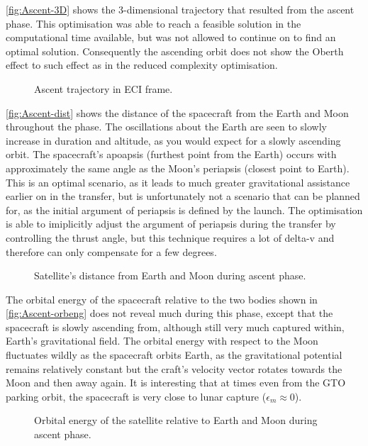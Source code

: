 \autoref{fig:Ascent-3D} shows the 3-dimensional trajectory that resulted from the ascent phase. This optimisation was able to reach a feasible solution in the computational time available, but was not allowed to continue on to find an optimal solution. Consequently the ascending orbit does not show the Oberth effect to such effect as in the reduced complexity optimisation.

\begin{figure}
\centering
\def\svgwidth{\figurewidth}

\caption{Ascent trajectory in ECI frame.}
\label{fig:Ascent-3D}
\end{figure}

\autoref{fig:Ascent-dist} shows the distance of the spacecraft from the Earth and Moon throughout the phase. The oscillations about the Earth are seen to slowly increase in duration and altitude, as you would expect for a slowly ascending orbit. The spacecraft's apoapsis (furthest point from the Earth) occurs with approximately the same angle as the Moon's periapsis (closest point to Earth). This is an optimal scenario, as it leads to much greater gravitational assistance earlier on in the transfer, but is unfortunately not a scenario that can be planned for, as the initial argument of periapsis is defined by the launch. The optimisation is able to imiplicitly adjust the argument of periapsis during the transfer by controlling the thrust angle, but this technique requires a lot of delta-v and therefore can only compensate for a few degrees.

\begin{figure}
\centering
\def\svgwidth{\figurewidth}

\caption{Satellite's distance from Earth and Moon during ascent phase.}
\label{fig:Ascent-dist}
\end{figure}

The orbital energy of the spacecraft relative to the two bodies shown in \autoref{fig:Ascent-orbeng} does not reveal much during this phase, except that the spacecraft is slowly ascending from, although still very much captured within, Earth's gravitational field. The orbital energy with respect to the Moon fluctuates wildly as the spacecraft orbits Earth, as the gravitational potential remains relatively constant but the craft's velocity vector rotates towards the Moon and then away again. It is interesting that at times even from the GTO parking orbit, the spacecraft is very close to lunar capture ($\epsilon_m\approx0$).

\begin{figure}
\centering
\def\svgwidth{\figurewidth}

\caption{Orbital energy of the satellite relative to Earth and Moon during ascent phase.}
\label{fig:Ascent-orbeng}
\end{figure}

